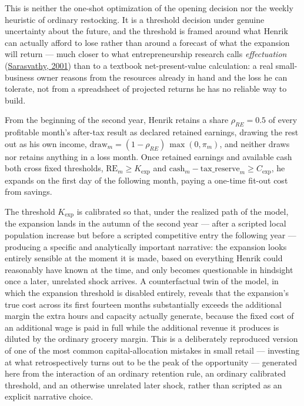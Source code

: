 \documentclass[12pt,a4paper]{article}
\begin{document}
This is neither the one-shot optimization of the opening decision nor
the weekly heuristic of ordinary restocking. It is a threshold decision
under genuine uncertainty about the future, and the threshold is framed
around what Henrik can actually afford to lose rather than around a
forecast of what the expansion will return --- much closer to what
entrepreneurship research calls \emph{effectuation}
(\hyperlink{ref:sarasvathy2001}{Sarasvathy, 2001}) than to a textbook net-present-value
calculation: a real small-business owner reasons from the resources
already in hand and the loss he can tolerate, not from a spreadsheet of
projected returns he has no reliable way to build.

From the beginning of the second year, Henrik retains a share $\rho_{RE}
= 0.5$ of every profitable month's after-tax result as declared retained
earnings, drawing the rest out as his own income,
$\text{draw}_m = (1-\rho_{RE})\,\max(0, \pi_m)$, and neither draws nor
retains anything in a loss month. Once retained earnings and available
cash both cross fixed thresholds, $\text{RE}_m \geq K_{\text{exp}}$ and
$\text{cash}_m - \text{tax\_reserve}_m \geq C_{\text{exp}}$, he expands
on the first day of the following month, paying a one-time fit-out cost
from savings.

The threshold $K_{\text{exp}}$ is calibrated so that, under the realized
path of the model, the expansion lands in the autumn of the second year
--- after a scripted local population increase but before a scripted
competitive entry the following year --- producing a specific and
analytically important narrative: the expansion looks entirely sensible
at the moment it is made, based on everything Henrik could reasonably
have known at the time, and only becomes questionable in hindsight once
a later, unrelated shock arrives. A counterfactual twin of the model, in
which the expansion threshold is disabled entirely, reveals that the
expansion's true cost across its first fourteen months substantially
exceeds the additional margin the extra hours and capacity actually
generate, because the fixed cost of an additional wage is paid in full
while the additional revenue it produces is diluted by the ordinary
grocery margin. This is a deliberately reproduced version of one of the
most common capital-allocation mistakes in small retail --- investing at
what retrospectively turns out to be the peak of the opportunity ---
generated here from the interaction of an ordinary retention rule, an
ordinary calibrated threshold, and an otherwise unrelated later shock,
rather than scripted as an explicit narrative choice.
\end{document}

